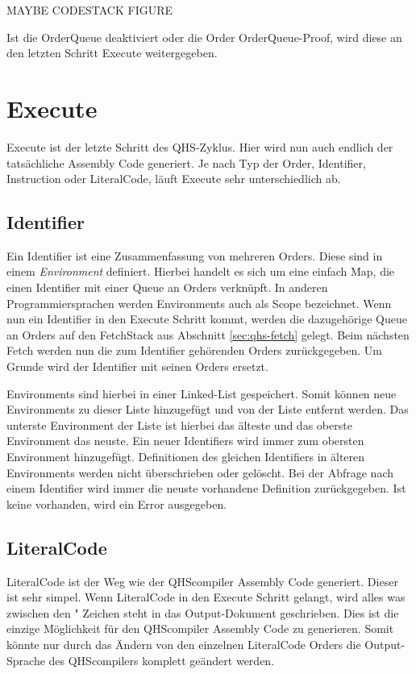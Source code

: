 MAYBE CODESTACK FIGURE

Ist die OrderQueue deaktiviert oder die Order OrderQueue-Proof, wird diese an den letzten Schritt Execute weitergegeben.

\section{Execute} \label{sec:qhs-execute}
Execute ist der letzte Schritt des QHS-Zyklus. Hier wird nun auch endlich der tatsächliche Assembly Code generiert. Je nach Typ der Order, Identifier, Instruction oder LiteralCode, läuft Execute sehr unterschiedlich ab.

\subsection{Identifier}
Ein Identifier ist eine Zusammenfassung von mehreren Orders. Diese sind in einem \textit{Environment} definiert.
Hierbei handelt es sich um eine einfach Map, die einen Identifier mit einer Queue an Orders verknüpft.
In anderen Programmiersprachen werden Environments auch als Scope bezeichnet.
Wenn nun ein Identifier in den Execute Schritt kommt, werden die dazugehörige Queue an Orders auf den FetchStack aus Abschnitt \ref{sec:qhs-fetch} gelegt.
Beim nächsten Fetch werden nun die zum Identifier gehörenden Orders zurückgegeben. Um Grunde wird der Identifier mit seinen Orders ersetzt.

Environments sind hierbei in einer Linked-List gespeichert. Somit können neue Environments zu dieser Liste hinzugefügt und von der Liste entfernt werden.
Das unterste Environment der Liste ist hierbei das älteste und das oberste Environment das neuste.
Ein neuer Identifiers wird immer zum obersten Environment hinzugefügt. Definitionen des gleichen Identifiers in älteren Environments werden nicht überschrieben oder gelöscht.
Bei der Abfrage nach einem Identifier wird immer die neuste vorhandene Definition zurückgegeben. Ist keine vorhanden, wird ein Error ausgegeben.

\subsection{LiteralCode}
LiteralCode ist der Weg wie der QHScompiler Assembly Code generiert. Dieser ist sehr simpel. Wenn LiteralCode in den Execute Schritt gelangt, wird alles was zwischen den " Zeichen steht in das Output-Dokument geschrieben.
Dies ist die einzige Möglichkeit für den QHScompiler Assembly Code zu generieren. Somit könnte nur durch das Ändern von den einzelnen LiteralCode Orders die Output-Sprache des QHScompilers komplett geändert werden.

